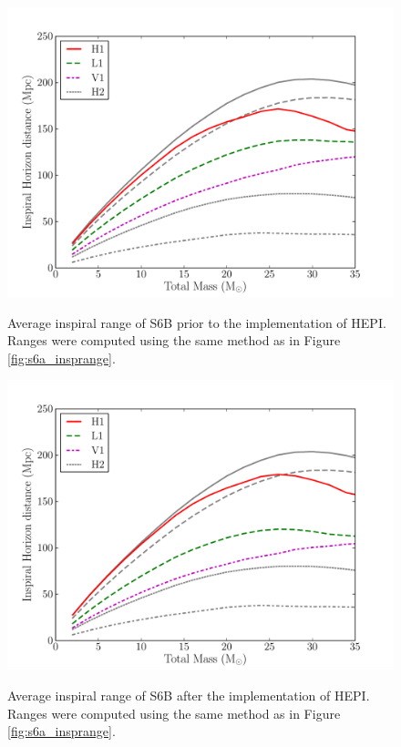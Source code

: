 \begin{figure}[p]
\begin{center}
\label{fig:s6b_pre-hepi_insprange}
\includegraphics[width=6in]{figures/s6b_pre-hepi_insprange.pdf}
\end{center}
\caption{Average inspiral range of S6B prior to the implementation of \ac{HEPI}. Ranges were computed using the same method as in Figure \ref{fig:s6a_insprange}.}
\end{figure}

\begin{figure}[p]
\begin{center}
\label{fig:s6b_post-hepi_insprange}
\includegraphics[width=6in]{figures/s6b_post-hepi_insprange.pdf}
\end{center}
\caption{Average inspiral range of S6B after the implementation of \ac{HEPI}. Ranges were computed using the same method as in Figure \ref{fig:s6a_insprange}.}
\end{figure}

